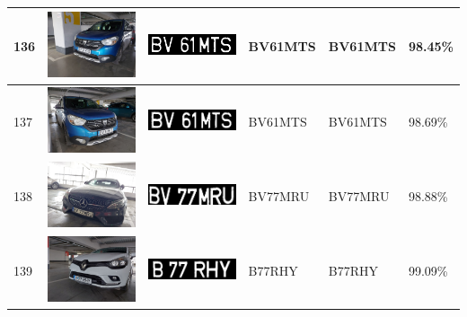 \documentclass[a4paper,12pt]{report}
\begin{document}
\begin{longtable}{| m{0.6cm} | m{3cm} | m{3cm} | m{1.8cm} | m{1.8cm} | m{1.8cm} |}
    136 & \includegraphics[width=3cm,keepaspectratio]{dataset/80_d1.jpg}  & \includegraphics[width=3cm,keepaspectratio]{segmentari/136.jpg} & BV61MTS             & BV61MTS              & 98.45\%    \\ \hline
    137 & \includegraphics[width=3cm,keepaspectratio]{dataset/80_s1.jpg}  & \includegraphics[width=3cm,keepaspectratio]{segmentari/137.jpg} & BV61MTS             & BV61MTS              & 98.69\%    \\ \hline
    138 & \includegraphics[width=3cm,keepaspectratio]{dataset/81_d1.jpg}  & \includegraphics[width=3cm,keepaspectratio]{segmentari/138.jpg} & BV77MRU             & BV77MRU              & 98.88\%    \\ \hline
    139 & \includegraphics[width=3cm,keepaspectratio]{dataset/82_d1.jpg}  & \includegraphics[width=3cm,keepaspectratio]{segmentari/139.jpg} & B77RHY              & B77RHY               & 99.09\%    \\ \hline

\end{longtable}
\end{document}
